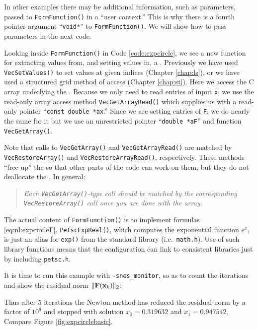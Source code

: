 In other examples there may be additional information, such as parameters, passed to \texttt{FormFunction()} in a ``user context.''  This is why there is a fourth pointer argument ``\texttt{void*}'' to \texttt{FormFunction()}.  We will show how to pass parameters in the next code.

Looking inside \texttt{FormFunction()} in Code \ref{code:expcircle}, we see a new function for extracting values from, and setting values in, a \pVec.  Previously we have used \texttt{VecSetValues()} to set values at given indices (Chapter \ref{chap:ls}), or we have used a \pDMDA structured grid method of access (Chapter \ref{chap:st}).  Here we access the C array underlying the \pVec.  Because we only need to read entries of input \pVec \texttt{x}, we use the read-only array access method \texttt{VecGetArrayRead()} which supplies us with a read-only pointer ``\texttt{const double *ax}.''  Since we are setting entries of \pVec \texttt{F}, we do nearly the same for it but we use an unrestricted pointer ``\texttt{double *aF}'' and function \texttt{VecGetArray()}.

Note that calls to \texttt{VecGetArray()} and \texttt{VecGetArrayRead()} are matched by \texttt{VecRestoreArray()} and \texttt{VecRestoreArrayRead()}, respectively.  These methods ``free-up''  the \pVecs so that other parts of the code can work on them, but they do not deallocate the \pVecs.  In general:
\begin{quote}
\emph{Each \emph{\texttt{VecGetArray()}}-type call should be matched by the corresponding \emph{\texttt{VecRestoreArray()}} call once you are done with the array.}
\end{quote}

The actual content of \texttt{FormFunction()} is to implement formulas \eqref{eq:nl:expcircleF}.  \texttt{PetscExpReal()}, which computes the exponential function $e^x$, is just an alias for \texttt{exp()} from the standard library (i.e.~\texttt{math.h}).  Use of such \PETSc library functions means that the \PETSc configuration can link to consistent libraries just by including \texttt{petsc.h}.

It is time to run this example with \texttt{-snes\_monitor}, so as to count the iterations and show the residual norm $\|\mathbf{F}(\mathbf{x}_k)\|_2$:
Thus after 5 iterations the Newton method has reduced the residual norm by a factor of $10^9$ and stopped with solution $x_0=0.319632$ and $x_1=0.947542$.  Compare Figure \ref{fig:expcirclebasic}.

